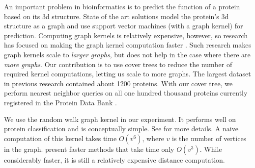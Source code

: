 \documentclass[../main.tex]{subfiles}
\begin{document}
An important problem in bioinformatics is to predict the function of a protein based on its 3d structure.
State of the art solutions model the protein's 3d structure as a graph and use support vector machines (with a graph kernel) for prediction.
Computing graph kernels is relatively expensive, however, so research has focused on making the graph kernel computation faster \citep{Vishwanathan2010,Shervashidze2011}.
Such research makes graph kernels scale to \emph{larger graphs}, but does not help in the case where there are \emph{more graphs}.
Our contribution is to use cover trees to reduce the number of required kernel computations, letting us scale to more graphs.
The largest dataset in previous research contained about 1200 proteins.
With our cover tree, we perform nearest neighbor queries on all one hundred thousand proteins currently registered in the Protein Data Bank \citep{Berman2000}.

We use the random walk graph kernel in our experiment.
It performs well on protein classification and is conceptually simple.
See \citet{Vishwanathan2010} for more details.
A naive computation of this kernel takes time $O(v^6)$, where $v$ is the number of vertices in the graph.
\citet{Vishwanathan2010} present faster methods that take time only $O(v^3)$.
While considerably faster, it is still a relatively expensive distance computation.
\end{document}
